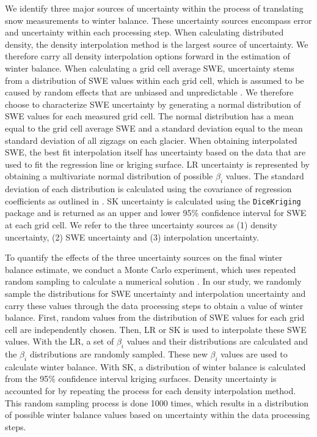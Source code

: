 \documentclass[review,oneside, letterpaper]{igs}
\begin{document}
We identify three major sources of uncertainty within the process of translating snow measurements to winter balance. These uncertainty sources encompass error and uncertainty within each processing step. When calculating distributed density, the density interpolation method is the largest source of uncertainty. We therefore carry all density interpolation options forward in the estimation of winter balance. When calculating a grid cell average SWE, uncertainty stems from a distribution of SWE values within each grid cell, which is assumed to be caused by random effects that are unbiased and unpredictable \citep{Watson2006}. We therefore choose to characterize SWE uncertainty by generating a normal distribution of SWE values for each measured grid cell. The normal distribution has a mean equal to the grid cell average SWE and a standard deviation equal to the mean standard deviation of all zigzags on each glacier. When obtaining interpolated SWE, the best fit interpolation itself has uncertainty based on the data that are used to fit the regression line or kriging surface. LR uncertainty is represented by obtaining a multivariate normal distribution of possible $\beta_i$ values. The standard deviation of each distribution is calculated using the covariance of regression coefficients as outlined in \cite{Bagos2015}. SK uncertainty is calculated using the \texttt{DiceKriging} package and is returned as an upper and lower 95\% confidence interval for SWE at each grid cell. We refer to the three uncertainty sources as (1) density uncertainty, (2) SWE uncertainty and (3) interpolation uncertainty. 

To quantify the effects of the three uncertainty sources on the final winter balance estimate, we conduct a Monte Carlo experiment, which uses repeated random sampling to calculate a numerical solution \citep{Metropolis1949}. In our study, we randomly sample the distributions for SWE uncertainty and interpolation uncertainty and carry these values through the data processing steps to obtain a value of winter balance. First, random values from the distribution of SWE values for each grid cell are independently chosen. Then, LR or SK is used to interpolate these SWE values. With the LR, a set of $\beta_i$ values and their distributions are calculated and the $\beta_i$ distributions are randomly sampled. These new $\beta_i$ values are used to calculate winter balance. With SK, a distribution of winter balance is calculated from the 95\% confidence interval kriging surfaces. Density uncertainty is accounted for by repeating the process for each density interpolation method. This random sampling process is done 1000 times, which results in a distribution of possible winter balance values based on uncertainty within the data processing steps.
\end{document}

